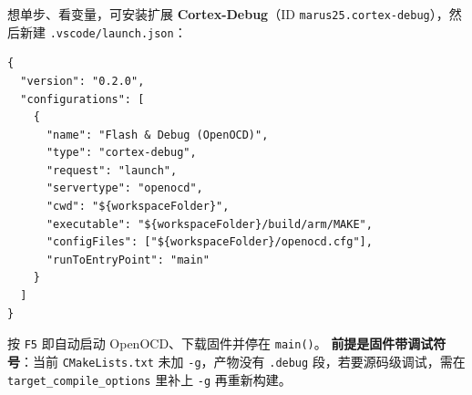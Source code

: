 想单步、看变量，可安装扩展 \textbf{Cortex-Debug}（ID
\texttt{marus25.cortex-debug}），然后新建 \texttt{.vscode/launch.json}：

\begin{lstlisting}[style=generic]
{
  "version": "0.2.0",
  "configurations": [
    {
      "name": "Flash & Debug (OpenOCD)",
      "type": "cortex-debug",
      "request": "launch",
      "servertype": "openocd",
      "cwd": "${workspaceFolder}",
      "executable": "${workspaceFolder}/build/arm/MAKE",
      "configFiles": ["${workspaceFolder}/openocd.cfg"],
      "runToEntryPoint": "main"
    }
  ]
}
\end{lstlisting}

按 \texttt{F5} 即自动启动 OpenOCD、下载固件并停在 \texttt{main()}。
\textbf{前提是固件带调试符号}：当前 \texttt{CMakeLists.txt} 未加
\texttt{-g}，产物没有 \texttt{.debug} 段，若要源码级调试，需在
\texttt{target\_compile\_options} 里补上 \texttt{-g} 再重新构建。
